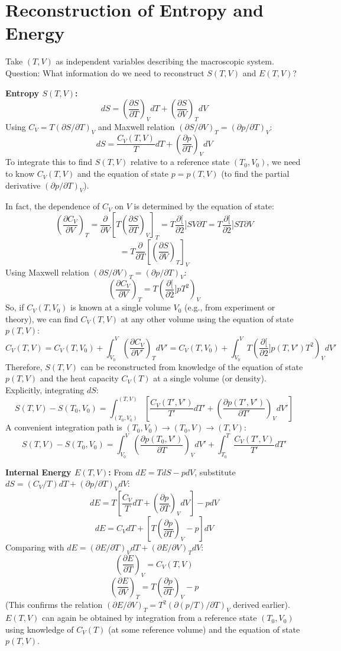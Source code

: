 \documentclass[11pt]{article}
\newcommand{\pderiv}[2]{\frac{\partial #1}{\partial #2}}
\begin{document}
\section*{Reconstruction of Entropy and Energy}

Take $(T,V)$ as independent variables describing the macroscopic system.
Question: What information do we need to reconstruct $S(T,V)$ and $E(T,V)$?

\textbf{Entropy $S(T,V)$:}
\[ dS = \left( \pderiv{S}{T} \right)_V dT + \left( \pderiv{S}{V} \right)_T dV \]
Using $C_V = T (\partial S / \partial T)_V$ and Maxwell relation $(\partial S / \partial V)_T = (\partial p / \partial T)_V$:
\[ dS = \frac{C_V(T,V)}{T} dT + \left( \pderiv{p}{T} \right)_V dV \]
To integrate this to find $S(T,V)$ relative to a reference state $(T_0, V_0)$, we need to know $C_V(T,V)$ and the equation of state $p=p(T,V)$ (to find the partial derivative $(\partial p / \partial T)_V$).

In fact, the dependence of $C_V$ on $V$ is determined by the equation of state:
\[ \left( \pderiv{C_V}{V} \right)_T = \pderiv{}{V} \left[ T \left( \pderiv{S}{T} \right)_V \right]_T = T \pderiv[2]{S}{V \partial T} = T \pderiv[2]{S}{T \partial V} \]
\[ = T \pderiv{}{T} \left[ \left( \pderiv{S}{V} \right)_T \right]_V \]
Using Maxwell relation $(\partial S / \partial V)_T = (\partial p / \partial T)_V$:
\[ \left( \pderiv{C_V}{V} \right)_T = T \left( \pderiv[2]{p}{T^2} \right)_V \]
So, if $C_V(T, V_0)$ is known at a single volume $V_0$ (e.g., from experiment or theory), we can find $C_V(T,V)$ at any other volume using the equation of state $p(T,V)$:
\[ C_V(T,V) = C_V(T,V_0) + \int_{V_0}^V \left( \pderiv{C_V}{V'} \right)_T dV' = C_V(T,V_0) + \int_{V_0}^V T \left( \pderiv[2]{p(T,V')}{T^2} \right)_V dV' \]
Therefore, $S(T,V)$ can be reconstructed from knowledge of the equation of state $p(T,V)$ and the heat capacity $C_V(T)$ at a single volume (or density).
Explicitly, integrating $dS$:
\[ S(T,V) - S(T_0, V_0) = \int_{(T_0,V_0)}^{(T,V)} \left[ \frac{C_V(T',V')}{T'} dT' + \left( \pderiv{p(T',V')}{T'} \right)_V dV' \right] \]
A convenient integration path is $(T_0, V_0) \to (T_0, V) \to (T, V)$:
\[ S(T,V) - S(T_0, V_0) = \int_{V_0}^V \left( \pderiv{p(T_0,V')}{T} \right)_V dV' + \int_{T_0}^T \frac{C_V(T',V)}{T'} dT' \]

\textbf{Internal Energy $E(T,V)$:}
From $dE = T dS - p dV$, substitute $dS = (C_V/T) dT + (\partial p/\partial T)_V dV$:
\[ dE = T \left[ \frac{C_V}{T} dT + \left( \pderiv{p}{T} \right)_V dV \right] - p dV \]
\[ dE = C_V dT + \left[ T \left( \pderiv{p}{T} \right)_V - p \right] dV \]
Comparing with $dE = (\partial E/\partial T)_V dT + (\partial E/\partial V)_T dV$:
\[ \left( \pderiv{E}{T} \right)_V = C_V(T,V) \]
\[ \left( \pderiv{E}{V} \right)_T = T \left( \pderiv{p}{T} \right)_V - p \]
(This confirms the relation $(\partial E/\partial V)_T = T^2 (\partial (p/T)/\partial T)_V$ derived earlier).
$E(T,V)$ can again be obtained by integration from a reference state $(T_0, V_0)$ using knowledge of $C_V(T)$ (at some reference volume) and the equation of state $p(T,V)$.
\end{document}
